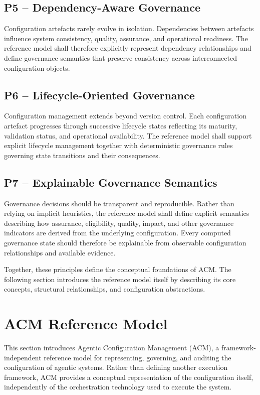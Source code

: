 \documentclass[10pt]{article}
\begin{document}
\subsection{P5 -- Dependency-Aware Governance}

Configuration artefacts rarely evolve in isolation. Dependencies between artefacts influence system consistency, quality, assurance, and operational readiness. The reference model shall therefore explicitly represent dependency relationships and define governance semantics that preserve consistency across interconnected configuration objects.

\subsection{P6 -- Lifecycle-Oriented Governance}

Configuration management extends beyond version control. Each configuration artefact progresses through successive lifecycle states reflecting its maturity, validation status, and operational availability. The reference model shall support explicit lifecycle management together with deterministic governance rules governing state transitions and their consequences.

\subsection{P7 -- Explainable Governance Semantics}

Governance decisions should be transparent and reproducible. Rather than relying on implicit heuristics, the reference model shall define explicit semantics describing how assurance, eligibility, quality, impact, and other governance indicators are derived from the underlying configuration. Every computed governance state should therefore be explainable from observable configuration relationships and available evidence.

Together, these principles define the conceptual foundations of ACM. The following section introduces the reference model itself by describing its core concepts, structural relationships, and configuration abstractions.

\section{ACM Reference Model}
\label{sec:acm_reference_model}

This section introduces Agentic Configuration Management (ACM), a framework-independent reference model for representing, governing, and auditing the configuration of agentic systems. Rather than defining another execution framework, ACM provides a conceptual representation of the configuration itself, independently of the orchestration technology used to execute the system.
\end{document}
